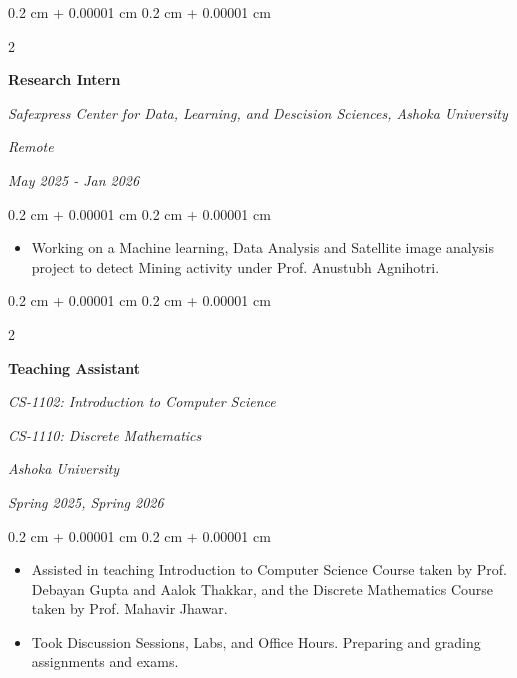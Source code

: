 \documentclass[10pt, letterpaper]{article}
\newenvironment{highlights}{
    \begin{itemize}[
        topsep=0.10 cm,
        parsep=0.10 cm,
        partopsep=0pt,
        itemsep=0pt,
        leftmargin=0.4 cm + 10pt
    ]
}{
    \end{itemize}
} %
\newenvironment{onecolentry}{
    \begin{adjustwidth}{
        0.2 cm + 0.00001 cm
    }{
        0.2 cm + 0.00001 cm
    }
}{
    \end{adjustwidth}
} %
\newenvironment{twocolentry}[2][]{
    \onecolentry
    \def\secondColumn{#2}
    \setcolumnwidth{\fill, 4.5 cm}
    \begin{paracol}{2}
}{
    \switchcolumn \raggedleft \secondColumn
    \end{paracol}
    \endonecolentry
} %
\begin{document}
        \vspace{0.2 cm}

    \begin{twocolentry}{
        \textit{Remote}    
            
        \textit{May 2025 - Jan 2026}}
            \textbf{Research Intern}
            
            \textit{Safexpress Center for Data, Learning, and Descision Sciences, Ashoka University}
        \end{twocolentry}

        \vspace{0.10 cm}
        \begin{onecolentry}
            \begin{highlights}
                \item Working on a Machine learning, Data Analysis and Satellite image analysis project to detect Mining activity under Prof. Anustubh Agnihotri.
            \end{highlights}
        \end{onecolentry}


        \vspace{0.2 cm}

    \begin{twocolentry}{
        \textit{Ashoka University}    
            
        \textit{Spring 2025, Spring 2026}}
        
            \textbf{Teaching Assistant}
            
            \textit{CS-1102: Introduction to Computer Science}

            \textit{CS-1110: Discrete Mathematics}
        \end{twocolentry}

        \vspace{0.10 cm}
        \begin{onecolentry}
            \begin{highlights}
                \item Assisted in teaching Introduction to Computer Science Course taken by Prof. Debayan Gupta and Aalok Thakkar, and the Discrete Mathematics Course taken by Prof. Mahavir Jhawar.
                \item Took Discussion Sessions, Labs, and Office Hours. Preparing and grading assignments and exams.
            \end{highlights}
        \end{onecolentry}
\end{document}
